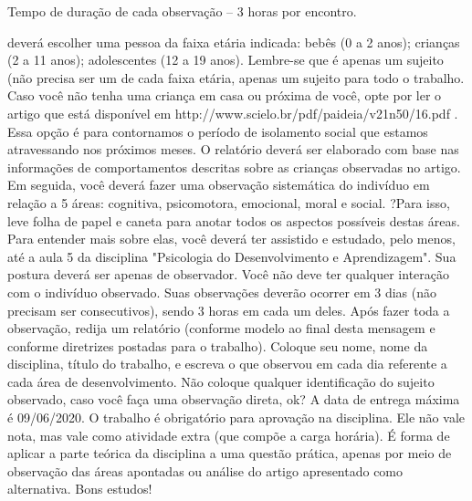 Tempo de duração de cada observação – 3 horas por encontro.

deverá escolher uma pessoa da faixa etária indicada: bebês (0 a 2 anos); crianças (2 a 11 anos); adolescentes (12 a 19 anos). Lembre-se que é apenas um sujeito (não precisa ser um de cada faixa etária, apenas um sujeito para todo o trabalho. Caso você não tenha uma criança em casa ou próxima de você, opte por ler o artigo que está disponível em http://www.scielo.br/pdf/paideia/v21n50/16.pdf  . Essa opção é para contornamos o período de isolamento social que estamos atravessando nos próximos meses. O relatório deverá ser elaborado com base nas informações de comportamentos descritas sobre as crianças observadas no artigo.
Em seguida, você deverá fazer uma observação sistemática do indivíduo em relação a 5 áreas: cognitiva, psicomotora, emocional, moral e social. ?Para isso, leve folha de papel e caneta para anotar todos os aspectos possíveis destas áreas. Para entender mais sobre elas, você deverá ter assistido e estudado, pelo menos, até a aula 5 da disciplina "Psicologia do Desenvolvimento e Aprendizagem".
Sua postura deverá ser apenas de observador. Você não deve ter qualquer interação com o indivíduo observado. Suas observações deverão ocorrer em 3 dias (não precisam ser consecutivos), sendo 3 horas em cada um deles.
Após fazer toda a observação, redija um relatório (conforme modelo ao final desta mensagem e conforme diretrizes postadas para o trabalho). Coloque seu nome, nome da disciplina, título do trabalho, e escreva o que observou em cada dia referente a cada área de desenvolvimento. Não coloque qualquer identificação do sujeito observado, caso você faça uma observação direta, ok?
A data de entrega máxima é 09/06/2020. O trabalho é obrigatório para aprovação na disciplina. Ele não vale nota, mas vale como atividade extra (que compõe a carga horária).
É forma de aplicar a parte teórica da disciplina a uma questão prática, apenas por meio de observação das áreas apontadas ou análise do artigo apresentado como alternativa.
Bons estudos!



\fi